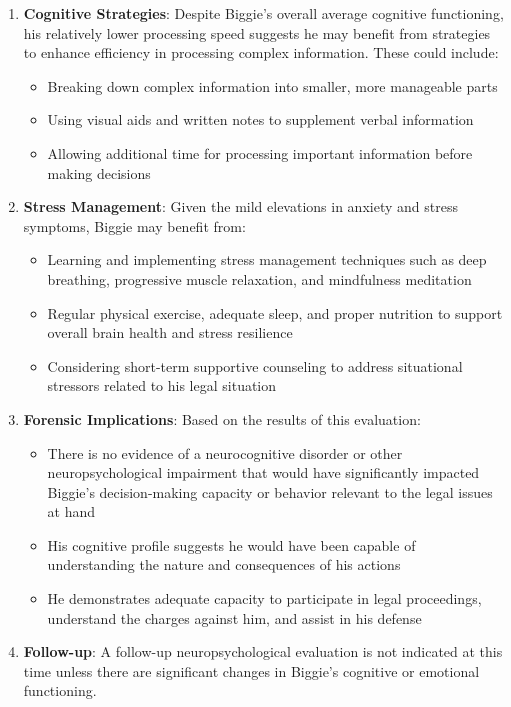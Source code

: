 \documentclass[
  letterpaper,
  DIV=11,
  numbers=noendperiod]{scrartcl}
\providecommand{\tightlist}{%
  \setlength{\itemsep}{0pt}\setlength{\parskip}{0pt}}
\begin{document}
\begin{enumerate}
\def\labelenumi{\arabic{enumi}.}
\tightlist
\item
  \textbf{Cognitive Strategies}: Despite Biggie's overall average
  cognitive functioning, his relatively lower processing speed suggests
  he may benefit from strategies to enhance efficiency in processing
  complex information. These could include:

  \begin{itemize}
  \tightlist
  \item
    Breaking down complex information into smaller, more manageable
    parts
  \item
    Using visual aids and written notes to supplement verbal information
  \item
    Allowing additional time for processing important information before
    making decisions
  \end{itemize}
\item
  \textbf{Stress Management}: Given the mild elevations in anxiety and
  stress symptoms, Biggie may benefit from:

  \begin{itemize}
  \tightlist
  \item
    Learning and implementing stress management techniques such as deep
    breathing, progressive muscle relaxation, and mindfulness meditation
  \item
    Regular physical exercise, adequate sleep, and proper nutrition to
    support overall brain health and stress resilience
  \item
    Considering short-term supportive counseling to address situational
    stressors related to his legal situation
  \end{itemize}
\item
  \textbf{Forensic Implications}: Based on the results of this
  evaluation:

  \begin{itemize}
  \tightlist
  \item
    There is no evidence of a neurocognitive disorder or other
    neuropsychological impairment that would have significantly impacted
    Biggie's decision-making capacity or behavior relevant to the legal
    issues at hand
  \item
    His cognitive profile suggests he would have been capable of
    understanding the nature and consequences of his actions
  \item
    He demonstrates adequate capacity to participate in legal
    proceedings, understand the charges against him, and assist in his
    defense
  \end{itemize}
\item
  \textbf{Follow-up}: A follow-up neuropsychological evaluation is not
  indicated at this time unless there are significant changes in
  Biggie's cognitive or emotional functioning.
\end{enumerate}
\end{document}
